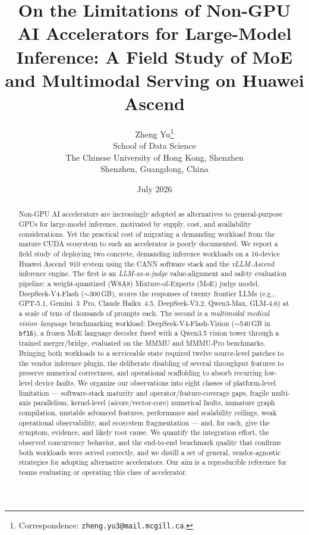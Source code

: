 \documentclass{article}
\title{On the Limitations of Non-GPU AI Accelerators for Large-Model
Inference: A Field Study of MoE and Multimodal Serving on Huawei Ascend}
\author{%
  Zheng Yu\thanks{Correspondence: \texttt{zheng.yu3@mail.mcgill.ca}.} \\
  School of Data Science \\
  The Chinese University of Hong Kong, Shenzhen \\
  Shenzhen, Guangdong, China \\
}
\date{July 2026}
\newcommand{\code}[1]{\texttt{#1}}
\begin{document}
\maketitle

\begin{abstract}
Non-GPU AI accelerators are increasingly adopted as alternatives to
general-purpose GPUs for large-model inference, motivated by supply, cost, and
availability considerations. Yet the practical cost of migrating a demanding
workload from the mature CUDA ecosystem to such an accelerator is poorly
documented. We report a field study of deploying two concrete, demanding
inference workloads on a 16-device Huawei Ascend~910 system using the CANN
software stack and the \emph{vLLM-Ascend} inference engine. The first is an
\emph{LLM-as-a-judge} value-alignment and safety evaluation pipeline: a
weight-quantized (W8A8) Mixture-of-Experts (MoE) judge model,
DeepSeek-V4-Flash ($\sim$300\,GB), scores the responses of twenty frontier LLMs
(e.g., GPT-5.1, Gemini~3~Pro, Claude Haiku~4.5, DeepSeek-V3.2, Qwen3-Max,
GLM-4.6) at a scale of tens of thousands of prompts each. The second is a
\emph{multimodal medical vision--language} benchmarking workload:
DeepSeek-V4-Flash-Vision ($\sim$540\,GB in \code{bf16}), a frozen MoE language
decoder fused with a Qwen3.5 vision tower through a trained
merger/bridge, evaluated on the MMMU and MMMU-Pro benchmarks. Bringing both
workloads to a serviceable state required twelve source-level patches to the
vendor inference plugin, the deliberate disabling of several throughput features
to preserve numerical correctness, and operational scaffolding to absorb
recurring low-level device faults. We organize our observations into eight
classes of platform-level limitation --- software-stack maturity and
operator/feature-coverage gaps, fragile multi-axis parallelism, kernel-level
(aicore/vector-core) numerical faults, immature graph compilation, unstable
advanced features, performance and scalability ceilings, weak operational
observability, and ecosystem fragmentation --- and, for each, give the symptom,
evidence, and likely root cause. We quantify the integration effort, the observed
concurrency behavior, and the end-to-end benchmark quality that confirms both
workloads were served correctly, and we distill a set of general, vendor-agnostic
strategies for adopting alternative accelerators. Our aim is a reproducible
reference for teams evaluating or operating this class of accelerator.
\end{abstract}
\end{document}
